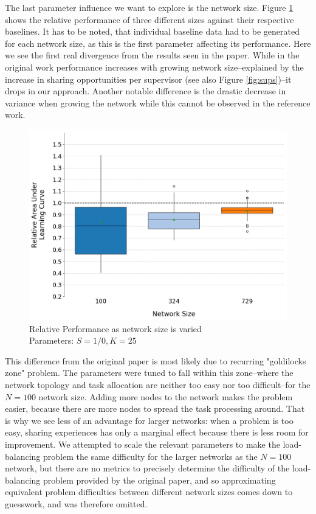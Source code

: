 \documentclass[letterpaper]{article}
\begin{document}
The last parameter influence we want to explore is the network size. Figure \ref{fig:sizes} shows the relative performance of three different sizes against their respective baselines. It has to be noted, that individual baseline data had to be generated for each network size, as this is the first parameter affecting its performance. Here we see the first real divergence from the results seen in the paper. While in the original work performance increases with growing network size--explained by the increase in sharing opportunities per supervisor (see also Figure \ref{fig:sups})--it drops in our approach. Another notable difference is the drastic decrease in variance when growing the network while this cannot be observed in the reference work.
\begin{figure}[H]
 \begin{center}
  \includegraphics[width=\linewidth]{figures/figure8}
  \caption{Relative Performance as network size is varied\\Parameters: $S=1/0,K=25$}
  \label{fig:sizes}
 \end{center}
\end{figure}

This difference from the original paper is most likely due to recurring "goldilocks zone" problem.  The parameters were tuned to fall within this zone--where the network topology and task allocation are neither too easy nor too difficult--for the $N=100$ network size.  Adding more nodes to the network makes the problem easier, because there are more nodes to spread the task processing around.  That is why we see less of an advantage for larger networks: when a problem is too easy, sharing experiences has only a marginal effect because there is less room for improvement.  We attempted to scale the relevant parameters to make the load-balancing problem the same difficulty for the larger networks as the $N=100$ network, but there are no metrics to precisely determine the difficulty of the load-balancing problem provided by the original paper, and so approximating equivalent problem difficulties between different network sizes comes down to guesswork, and was therefore omitted.
\end{document}
